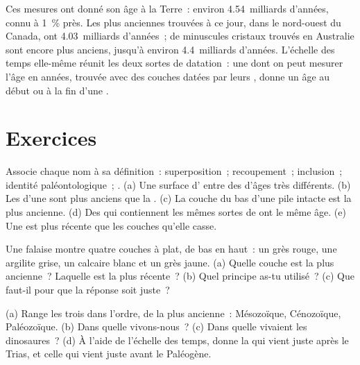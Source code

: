Ces mesures ont donné son âge à la Terre~: environ \num{4.54}~milliards
d'années, connu à 1~\% près. Les plus anciennes  trouvées à ce jour,
dans le nord-ouest du Canada, ont \num{4.03}~milliards d'années~; de
minuscules cristaux trouvés en Australie sont encore plus anciens, jusqu'à
environ \num{4.4}~milliards d'années. L'échelle des temps elle-même réunit
les deux sortes de datation~: une  dont on peut mesurer l'âge en
années, trouvée avec des couches datées par leurs , donne un âge
au début ou à la fin d'une .

\section{Exercices}

\begin{exercise}[$\star$]\label{exo:g7:geological-time:1}
Associe chaque nom à sa définition~: superposition~; recoupement~;
inclusion~; identité paléontologique~; . (a) Une surface
d' entre des  d'âges très différents. (b) Les  d'une
 sont plus anciens que la . (c) La couche du bas d'une pile
intacte est la plus ancienne. (d) Des  qui contiennent les mêmes
sortes de  ont le même âge. (e) Une  est plus récente que
les couches qu'elle casse.
\end{exercise}

\begin{exercise}[$\star$]\label{exo:g7:geological-time:2}
Une falaise montre quatre couches à plat, de bas en haut~: un grès rouge,
une argilite grise, un calcaire blanc et un grès jaune. (a) Quelle couche
est la plus ancienne~? Laquelle est la plus récente~? (b) Quel principe
as-tu utilisé~? (c) Que faut-il pour que la réponse soit juste~?
\end{exercise}

\begin{exercise}[$\star$]\label{exo:g7:geological-time:3}
(a) Range les trois  dans l'ordre, de la plus ancienne~: Mésozoïque,
Cénozoïque, Paléozoïque. (b) Dans quelle  vivons-nous~? (c) Dans quelle
 vivaient les dinosaures~? (d) À l'aide de l'échelle des temps, donne
la  qui vient juste après le Trias, et celle qui vient
juste avant le Paléogène.
\end{exercise}

